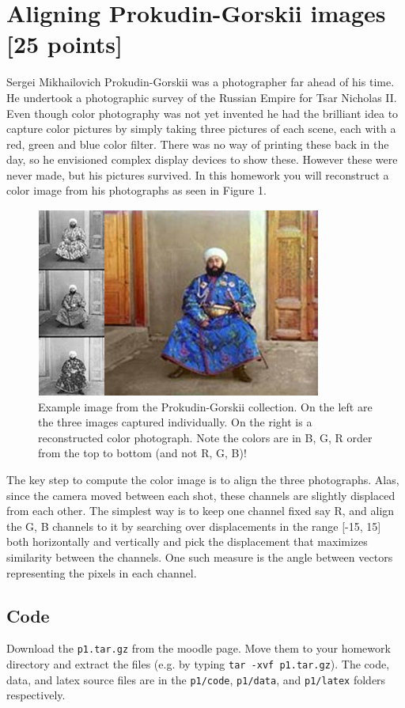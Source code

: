 \documentclass[10pt,letterpaper]{article}
\newcommand{\cmd}[1] {{\color{blue}\texttt{#1}}}
\begin{document}
\newpage
\section{Aligning Prokudin-Gorskii images [25 points]} 
Sergei Mikhailovich Prokudin-Gorskii was a photographer far ahead of his time. He undertook a photographic survey of the Russian Empire for Tsar Nicholas II. Even though color photography was not yet invented he had the brilliant idea to capture color pictures by simply taking three pictures of each scene, each with a red, green and blue color filter. There was no way of printing these back in the day, so he envisioned complex display devices to show these. However these were never made, but his pictures survived. In this homework you will reconstruct a color image from his photographs as seen in Figure 1.

\begin{figure}[h]
\centering
\includegraphics[width=0.65\linewidth]{example-Prokudin-Gorskii.png}
\caption{Example image from the Prokudin-Gorskii collection. On the left are the three images captured individually. On the right is a reconstructed color photograph. Note the colors are in B, G, R order from the top to bottom (and not R, G, B)!}
\end{figure}

The key step to compute the color image is to align the three photographs. Alas, since the camera moved between each shot, these channels are slightly displaced from each other. The simplest way is to keep one channel fixed say R, and align the G, B channels to it by searching over displacements in the range [-15, 15] both horizontally and vertically and pick the displacement that maximizes similarity between the channels. One such measure is the angle between vectors representing the pixels in each channel.

\subsection{Code}
Download the \cmd{p1.tar.gz} from the moodle page. Move them to your homework directory and extract the files (e.g. by typing \cmd{tar -xvf p1.tar.gz}). The code, data, and latex source files are in the \cmd{p1/code}, \cmd{p1/data}, and \cmd{p1/latex} folders respectively.
\end{document}
